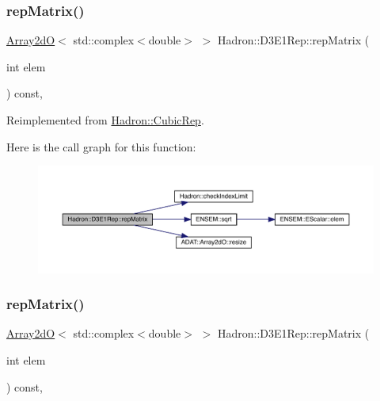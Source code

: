 \subsubsection{\texorpdfstring{repMatrix()}{repMatrix()}\hspace{0.1cm}{\footnotesize\ttfamily [1/3]}}
{\footnotesize\ttfamily \mbox{\hyperlink{classADAT_1_1Array2dO}{Array2dO}}$<$ std\+::complex$<$double$>$ $>$ Hadron\+::\+D3\+E1\+Rep\+::rep\+Matrix (\begin{DoxyParamCaption}\item[{int}]{elem }\end{DoxyParamCaption}) const\hspace{0.3cm}{\ttfamily [inline]}, {\ttfamily [virtual]}}



Reimplemented from \mbox{\hyperlink{structHadron_1_1CubicRep_ac5d7e9e6f4ab1158b5fce3e4ad9e8005}{Hadron\+::\+Cubic\+Rep}}.

Here is the call graph for this function\+:
\nopagebreak
\begin{figure}[H]
\begin{center}
\leavevmode
\includegraphics[width=350pt]{d3/daf/structHadron_1_1D3E1Rep_ac66aebdefbd99d129891c85cbc86b430_cgraph}
\end{center}
\end{figure}
\mbox{\label{structHadron_1_1D3E1Rep_ac66aebdefbd99d129891c85cbc86b430}} 
\subsubsection{\texorpdfstring{repMatrix()}{repMatrix()}\hspace{0.1cm}{\footnotesize\ttfamily [2/3]}}
{\footnotesize\ttfamily \mbox{\hyperlink{classADAT_1_1Array2dO}{Array2dO}}$<$ std\+::complex$<$double$>$ $>$ Hadron\+::\+D3\+E1\+Rep\+::rep\+Matrix (\begin{DoxyParamCaption}\item[{int}]{elem }\end{DoxyParamCaption}) const\hspace{0.3cm}{\ttfamily [inline]}, {\ttfamily [virtual]}}



